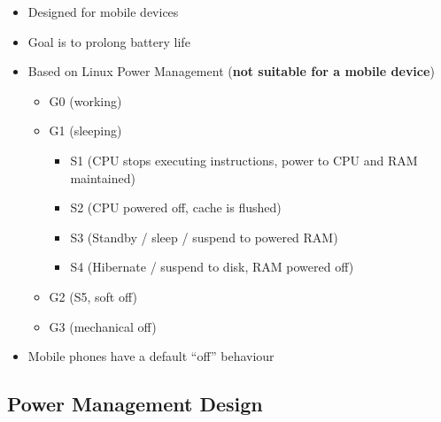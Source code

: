 \documentclass{article}
\begin{document}
\begin{itemize}
  \item  Designed for mobile devices 
  \item Goal is to prolong battery life 
  \item Based on Linux Power Management (\textbf{not suitable for a mobile device})
  \begin{itemize}
    \item G0 (working) 
    \item G1 (sleeping)
    \begin{itemize}
      \item S1 (CPU stops executing instructions, power to CPU and RAM maintained) 
      \item S2 (CPU powered off, cache is flushed) 
      \item S3 (Standby / sleep / suspend to powered RAM) 
      \item S4 (Hibernate / suspend to disk, RAM powered off)
    \end{itemize}
    \item G2 (S5, soft off) 
    \item G3 (mechanical off) 
   \end{itemize}  
  \item Mobile phones have a default “off” behaviour
\end{itemize}

\subsection{Power Management Design}
\end{document}
